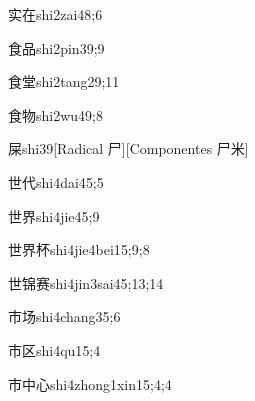 \begin{verbete}{实在}{shi2zai4}{8;6}
\end{verbete}

\begin{verbete}{食品}{shi2pin3}{9;9}
\end{verbete}

\begin{verbete}{食堂}{shi2tang2}{9;11}
\end{verbete}

\begin{verbete}{食物}{shi2wu4}{9;8}
\end{verbete}

\begin{verbete}{屎}{shi3}{9}[Radical 尸][Componentes 尸米]
\end{verbete}

\begin{verbete}{世代}{shi4dai4}{5;5}
\end{verbete}

\begin{verbete}{世界}{shi4jie4}{5;9}
\end{verbete}

\begin{verbete}{世界杯}{shi4jie4bei1}{5;9;8}
\end{verbete}

\begin{verbete}{世锦赛}{shi4jin3sai4}{5;13;14}
\end{verbete}

\begin{verbete}{市场}{shi4chang3}{5;6}
\end{verbete}

\begin{verbete}{市区}{shi4qu1}{5;4}
\end{verbete}

\begin{verbete}{市中心}{shi4zhong1xin1}{5;4;4}
\end{verbete}

